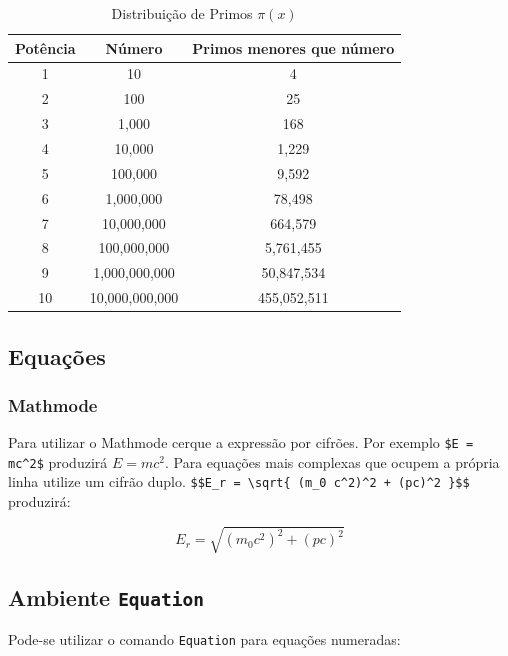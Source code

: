 \documentclass[11pt,a4paper]{article}
\begin{document}
\begin{table}[!h]
\centering
\begin{tabular}{c|c|c}   %
\toprule
Potência   &    Número  & Primos menores que número  \\  \midrule
1  &    10      &   4                        \\
2  &	100 	&   25 	                     \\
3  &	1,000   &	168 	                 \\
4  &	10,000  &	1,229 	                 \\
5  &	100,000 &	9,592 	                 \\
6  &	1,000,000   & 	78,498 	             \\
7  &	10,000,000  &	664,579 	         \\
8  &	100,000,000 &	5,761,455 	         \\
9  &    1,000,000,000  &	50,847,534 	     \\
10 &	10,000,000,000 &	455,052,511      \\   \toprule \bottomrule
\end{tabular}
\caption{Distribuição de Primos $\pi(x)$} \label{tab:tabela}
\end{table}


\subsection{Equações}

\subsubsection{Mathmode}

Para utilizar o Mathmode cerque a expressão por cifrões. Por exemplo \verb!$E = mc^2$!  produzirá $E = mc^2$. Para equações mais complexas que ocupem a própria linha utilize um cifrão duplo. \verb!$$E_r = \sqrt{ (m_0 c^2)^2 + (pc)^2 }$$! produzirá:

$$E_r = \sqrt{ (m_0 c^2)^2 + (pc)^2 }$$

\subsection{Ambiente \texttt{Equation}}

Pode-se utilizar o comando \texttt{Equation} para equações numeradas:
\end{document}
